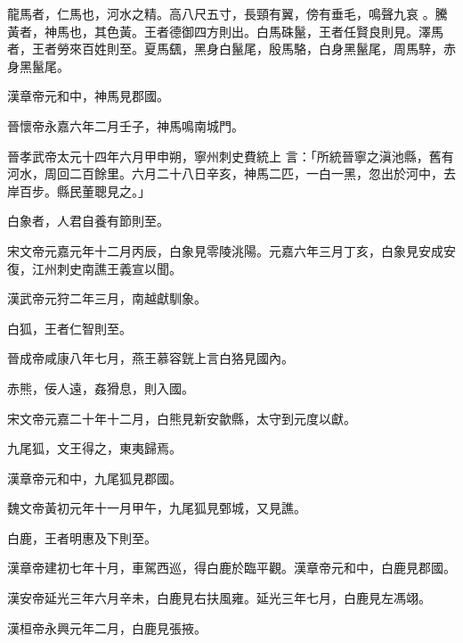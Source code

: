 \begin{pinyinscope}
龍馬者，仁馬也，河水之精。高八尺五寸，長頸有翼，傍有垂毛，鳴聲九哀
 。騰黃者，神馬也，其色黃。王者德御四方則出。白馬硃鬣，王者任賢良則見。澤馬者，王者勞來百姓則至。夏馬颻，黑身白鬣尾，殷馬駱，白身黑鬣尾，周馬騂，赤身黑鬣尾。



 漢章帝元和中，神馬見郡國。



 晉懷帝永嘉六年二月壬子，神馬鳴南城門。



 晉孝武帝太元十四年六月甲申朔，寧州刺史費統上
 言：「所統晉寧之滇池縣，舊有河水，周回二百餘里。六月二十八日辛亥，神馬二匹，一白一黑，忽出於河中，去岸百步。縣民董聰見之。」



 白象者，人君自養有節則至。



 宋文帝元嘉元年十二月丙辰，白象見零陵洮陽。元嘉六年三月丁亥，白象見安成安復，江州刺史南譙王義宣以聞。



 漢武帝元狩二年三月，南越獻馴象。



 白狐，王者仁智則至。



 晉成帝咸康八年七月，燕王慕容皝上言白狢見國內。



 赤熊，佞人遠，姦猾息，則入國。



 宋文帝元嘉二十年十二月，白熊見新安歙縣，太守到元度以獻。



 九尾狐，文王得之，東夷歸焉。



 漢章帝元和中，九尾狐見郡國。



 魏文帝黃初元年十一月甲午，九尾狐見鄄城，又見譙。



 白鹿，王者明惠及下則至。



 漢章帝建初七年十月，車駕西巡，得白鹿於臨平觀。漢章帝元和中，白鹿見郡國。



 漢安帝延光三年六月辛未，白鹿見右扶風雍。延光三年七月，白鹿見左馮翊。



 漢桓帝永興元年二月，白鹿見張掖。




\end{pinyinscope}
